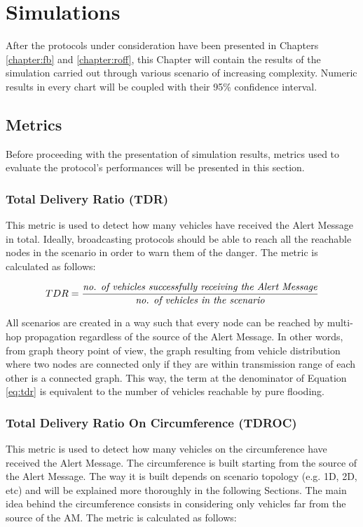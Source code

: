 

\chapter{Simulations}
	\label{chapter:simulations}
	After the protocols under consideration have been presented in Chapters \ref{chapter:fb} and \ref{chapter:roff}, this Chapter will contain the results of the simulation carried out through various scenario of increasing complexity. Numeric results in every chart will be coupled with their 95\% confidence interval.
	
	\section{Metrics}
		\label{sec:metrics}
		Before proceeding with the presentation of simulation results, metrics used to evaluate the protocol's performances will be presented in this section. 
		
		\subsection{Total Delivery Ratio (TDR)}
			\label{ssec:tdr}
			This metric is used to detect how many vehicles have received the Alert Message in total. Ideally, broadcasting protocols should be able to reach all the reachable nodes in the scenario in order to warn them of the danger. The metric is calculated as follows:
			
			\begin{gather}
				\label{eq:tdr}
				TDR = \frac{\textrm{\textit{no. of vehicles successfully receiving the Alert Message}}}{\textrm{\textit{no. of vehicles in the scenario}}}
			\end{gather}
			
			All scenarios are created in a way such that every node can be reached by multi-hop propagation regardless of the source of the Alert Message. In other words, from graph theory point of view, the graph resulting from vehicle distribution where two nodes are connected only if they are within transmission range of each other is a connected graph. This way, the term at the denominator of Equation \ref{eq:tdr} is equivalent to the number of vehicles reachable by pure flooding.
			
		\subsection{Total Delivery Ratio On Circumference (TDROC)}
			This metric is used to detect how many vehicles on the circumference have received the Alert Message. The circumference is built starting from the source of the Alert Message. The way it is built depends on scenario topology (e.g. 1D, 2D, etc) and will be explained more thoroughly in the following Sections. The main idea behind the circumference consists in considering only vehicles far from the source of the AM. The metric is calculated as follows:
			
